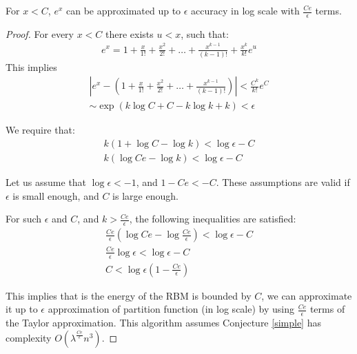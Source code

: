 \begin{lemma}
	For $x < C$, $e^x$ can be approximated up to $\epsilon$ accuracy in log scale with $\frac{Ce}{\epsilon}$ terms. 
\end{lemma}
\begin{proof}

For every $x < C$ there exists $u < x$, such that:  
\begin{align*}
	e^x = 1 + \frac{x}{1!} + \frac{x^2}{2!} + \dots + \frac{x^{k - 1}}{(k - 1)!} + \frac{x^k}{k!}e^u
\end{align*}
This implies
\begin{align*}
	|e^x - (1 + \frac{x}{1!} + \frac{x^2}{2!} + \dots + \frac{x^{k - 1}}{(k - 1)!}) | < \frac{C^k}{k!}e^C \\
	\sim \exp(k\log{C} + C - k\log{k} + k) < \epsilon
\end{align*}

We require that: 
\begin{align*}
	k (1 + \log{C} - \log{k}) < \log{\epsilon} - C \\ 
	k (\log{Ce} - \log{k}) < \log{\epsilon} - C
\end{align*}

Let us assume that $\log{\epsilon} < -1$, and $1 - Ce < -C$. These assumptions are valid if $\epsilon$ is small
enough, and $C$ is large enough.


For such $\epsilon$ and $C$, and $k > \frac{Ce}{\epsilon}$, the
following inequalities are satisfied:
\begin{align*}
	\frac{Ce}{\epsilon} (\log{Ce} - \log{\frac{Ce}{\epsilon}}) < \log{\epsilon} - C \\
	\frac{Ce}{\epsilon} \log{\epsilon} < \log{\epsilon} - C\\
	C < \log{\epsilon}(1 - \frac{Ce}{\epsilon})
\end{align*}

This implies that is the energy of the RBM is bounded by $C$, we can
approximate it up to $\epsilon$ approximation of partition function
(in log scale) by using $\frac{Ce}{\epsilon}$ terms of the Taylor
approximation. This algorithm assumes Conjecture \ref{simple} has
complexity $O(\lambda^{\frac{Ce}{\epsilon}}n^3)$.

\vspace{-5mm}
\end{proof}
\vspace{-5mm}


